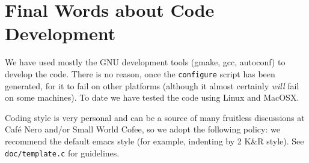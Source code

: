 \section{Final Words about Code Development}

We have used mostly the GNU development tools (gmake, gcc, autoconf) to
develop the code. There is no reason, once the {\tt configure} script has been
generated, for it to fail on other platforms (although it almost
certainly {\em will} fail
on some machines).   To date we have tested the code using Linux and MacOSX.

Coding style is very personal and can be a source of many fruitless
discussions at Caf\'{e} Nero and/or Small World Cofee, so we adopt the
following policy:  we recommend the default emacs style 
(for example, indenting by 2 K\&R style). See {\tt doc/template.c} for
guidelines.



